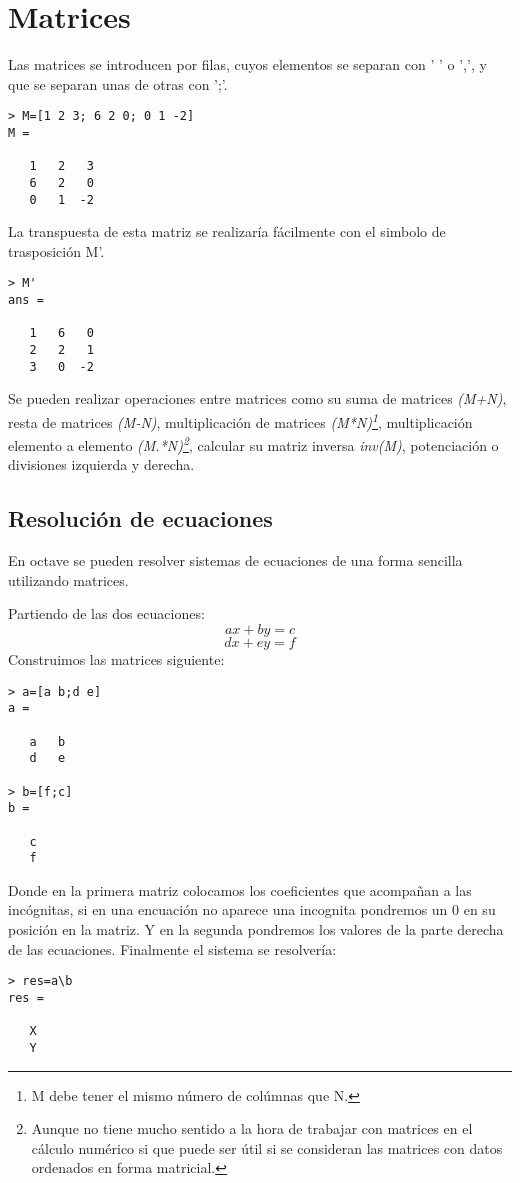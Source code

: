 \documentclass[a4,12pt,graphicx,caption,rotating]{article}
\begin{document}
\section{Matrices}
Las matrices se introducen por filas, cuyos elementos se separan con ' ' o ',', y que se separan unas de otras con ';'.
\begin{verbatim}> M=[1 2 3; 6 2 0; 0 1 -2]
M =

   1   2   3
   6   2   0
   0   1  -2
\end{verbatim}
La transpuesta de esta matriz se realizaría fácilmente con el simbolo de trasposición M'.
\begin{verbatim}
> M'
ans =

   1   6   0
   2   2   1
   3   0  -2
\end{verbatim}
Se pueden realizar operaciones entre matrices como su suma de matrices \emph{(M+N)}, resta de matrices \emph{(M-N)}, multiplicación de matrices \emph{(M*N)\footnote{M debe tener el mismo número de colúmnas que N.}}, multiplicación elemento a elemento \emph{(M.*N)\footnote{Aunque no tiene mucho sentido a la hora de trabajar con matrices en el cálculo numérico si que puede ser útil si se consideran las matrices con datos ordenados en forma matricial.}}, calcular su matriz inversa \emph{inv(M)}, potenciación o divisiones izquierda y derecha.
\subsection{Resolución de ecuaciones}
En octave se pueden resolver sistemas de ecuaciones de una forma sencilla utilizando matrices.

Partiendo de las dos ecuaciones:
\begin{displaymath}
ax+by=c
\end{displaymath} 
\begin{displaymath} 
dx+ey=f
\end{displaymath} 
Construimos las matrices siguiente:
\begin{verbatim}
> a=[a b;d e]
a =

   a   b
   d   e

> b=[f;c]
b =

   c
   f
\end{verbatim}
Donde en la primera matriz colocamos los coeficientes que acompañan a las incógnitas, si en una encuación no aparece una incognita pondremos un 0 en su posición en la matriz. Y en la segunda pondremos los valores de la parte derecha de las ecuaciones. Finalmente el sistema se resolvería:
\begin{verbatim}
> res=a\b
res =

   X
   Y
\end{verbatim}
\end{document}
